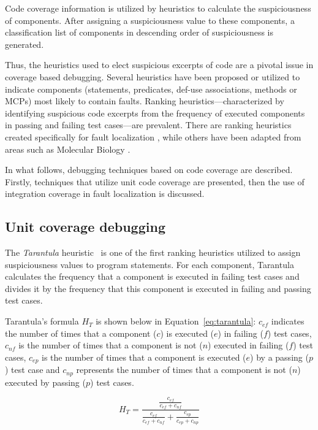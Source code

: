 \newcommand{\bl}{%
$\bullet$
}
Code coverage information is utilized by heuristics to calculate the
suspiciousness of components. After assigning a suspiciousness value to these
components, a classification list of components in descending order of
suspiciousness is generated.

Thus, the heuristics used to elect suspicious excerpts of code are a pivotal
issue in coverage based debugging. Several heuristics have been proposed or
utilized to indicate components (statements, predicates, def-use associations,
methods or MCPs) most likely to contain faults. Ranking
heuristics---characterized by identifying suspicious code excerpts from the
frequency of executed components in passing and failing test cases---are
prevalent.
There are ranking heuristics created specifically for fault localization
\cite{jones2002visualization,Wong2007}, while others have been adapted from
areas such as Molecular Biology \cite{Abreu2007,gonzalez2007}.

In what follows, debugging techniques based on code coverage are described.
Firstly, techniques that utilize unit code coverage are presented, then the use
of integration coverage in fault localization is discussed.

\subsection{Unit coverage debugging}

The \textit{Tarantula} heuristic~\cite{jones2002visualization} is one of the first ranking
heuristics utilized to assign suspiciousness values to program statements. For
each component, Tarantula calculates the frequency that a component is executed
in failing test cases and divides it by the frequency that this
component is executed in failing and passing test cases.

Tarantula's formula $H_{T}$ is shown below in Equation~\ref{eq:tarantula}:
$c_{ef}$ indicates the number of times that a component ($c$) is executed ($e$)
in failing ($f$) test cases, $c_{nf}$ is the number of times that a
component is not ($n$) executed in failing ($f$) test cases,
$c_{ep}$ is the number of times that a component is executed ($e$) by a
passing ($p$) test case and $c_{np}$ represents the number of times
that a component is not ($n$) executed by passing ($p$) test
cases.

\begin{equation} \label{eq:tarantula}
 H_{T} = \frac{\frac{c_{ef}}{c_{ef} + c_{nf}}}{\frac{c_{ef}}{c_{ef} + c_{nf}} + \frac{c_{ep}}{c_{ep} + c_{np}}}
\end{equation}



